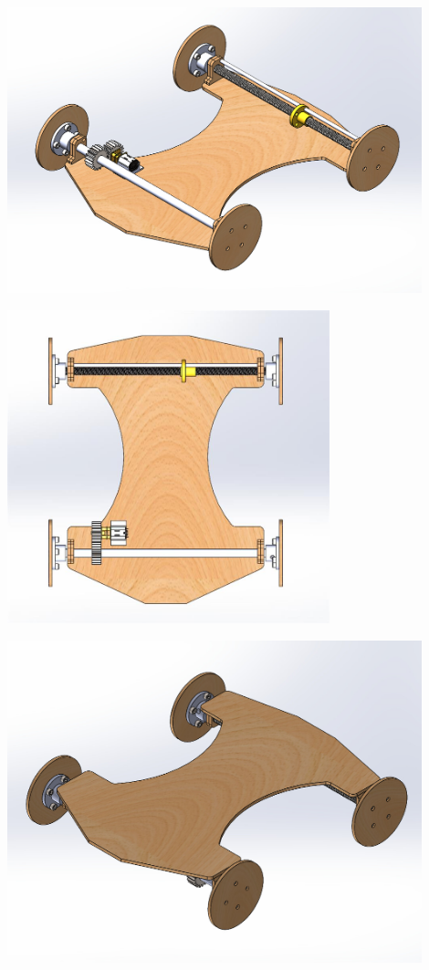 \documentclass{article}
\begin{document}
\begin{minipage}{0.3\textwidth}
	\centering
	\includegraphics[width=0.9\textwidth]{extracted_images2/image(2).png}
\end{minipage}\hfill
\begin{minipage}{0.3\textwidth}
	\centering
	\includegraphics[width=0.7\textwidth]{extracted_images2/image.jpg}
\end{minipage}\hfill
\begin{minipage}{0.3\textwidth}
	\centering
	\includegraphics[width=0.9\textwidth]{extracted_images2/image(4).png}
\end{minipage}\\[1em]
\end{document}
